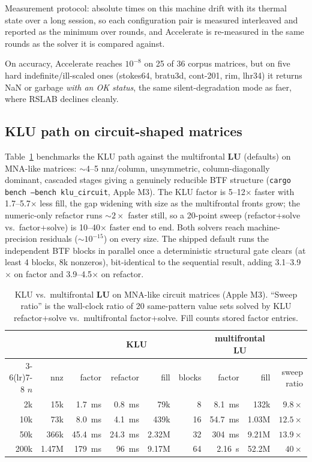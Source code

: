 \documentclass[11pt,a4paper]{article}
\newcommand{\tabfont}{\small}
\newcommand{\rT}{\textsf{RSLAB}}
\newcommand{\code}[1]{\texttt{\small #1}}
\newcommand{\nnz}{\mathrm{nnz}}
\newcommand{\LU}{\mathbf{L}\mathbf{U}}
\begin{document}
Measurement protocol: absolute times on this machine drift with its thermal state over a
long session, so each configuration pair is measured interleaved and reported as the
minimum over rounds, and Accelerate is re-measured in the same rounds as the solver it is
compared against.

On accuracy, Accelerate reaches $10^{-8}$ on 25 of 36 corpus matrices, but on five hard
indefinite/ill-scaled ones (stokes64, bratu3d, cont-201, rim, lhr34) it returns NaN or
garbage \emph{with an OK status}, the same silent-degradation mode as faer, where \rT{}
declines cleanly.

\subsection{KLU path on circuit-shaped matrices}
Table~\ref{tab:klu} benchmarks the KLU path against the multifrontal $\LU$ (defaults) on
MNA-like matrices: $\sim$4--5 nnz/column, unsymmetric, column-diagonally dominant,
cascaded stages giving a genuinely reducible BTF structure
(\code{cargo bench --bench klu\_circuit}, Apple M3). The KLU factor is
\numrange{5}{12}$\times$ faster with \numrange{1.7}{5.7}$\times$ less fill, the gap
widening with size as the multifrontal fronts grow; the numeric-only refactor runs
$\sim2\times$ faster still, so a 20-point sweep (refactor+solve vs.\ factor+solve) is
\numrange{10}{40}$\times$ faster end to end. Both solvers reach machine-precision
residuals ($\sim10^{-15}$) on every size. The shipped default runs the
independent BTF blocks in parallel once a deterministic structural gate clears
(at least 4 blocks, 8k nonzeros), bit-identical to the sequential result,
adding \numrange{3.1}{3.9}$\times$ on factor and \numrange{3.9}{4.5}$\times$
on refactor.

\begin{table}[htbp]
\centering\tabfont
\begin{tabular}{@{}rrrrrrrrr@{}}
\toprule
& & \multicolumn{4}{c}{KLU} & \multicolumn{2}{c}{multifrontal $\LU$} & \\
\cmidrule(lr){3-6}\cmidrule(lr){7-8}
$n$ & $\nnz$ & factor & refactor & fill & blocks & factor & fill & sweep ratio \\
\midrule
2k & 15k & \SI{1.7}{ms} & \SI{0.8}{ms} & 79k & 8 & \SI{8.1}{ms} & 132k & $9.8\times$ \\
10k & 73k & \SI{8.0}{ms} & \SI{4.1}{ms} & 439k & 16 & \SI{54.7}{ms} & 1.03M & $12.5\times$ \\
50k & 366k & \SI{45.4}{ms} & \SI{24.3}{ms} & 2.32M & 32 & \SI{304}{ms} & 9.21M & $13.9\times$ \\
200k & 1.47M & \SI{179}{ms} & \SI{96}{ms} & 9.17M & 64 & \SI{2.16}{s} & 52.2M & $40\times$ \\
\bottomrule
\end{tabular}
\caption{KLU vs.\ multifrontal $\LU$ on MNA-like circuit matrices (Apple M3). ``Sweep
ratio'' is the wall-clock ratio of 20 same-pattern value sets solved by KLU
refactor+solve vs.\ multifrontal factor+solve. Fill counts stored factor entries.}
\label{tab:klu}
\end{table}
\end{document}
